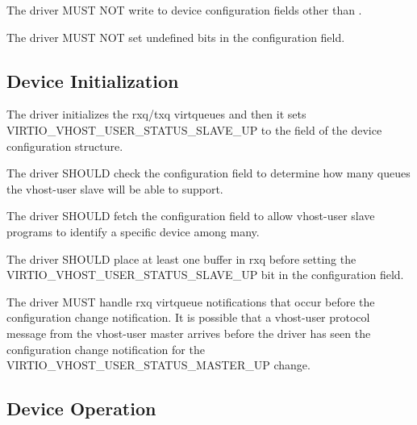 
The driver MUST NOT write to device configuration fields other than
.

The driver MUST NOT set undefined bits in the  configuration field.

\subsection{Device Initialization}\label{sec:Device Types / Vhost-user Device Backend / Device Initialization}

The driver initializes the rxq/txq virtqueues and then it sets
VIRTIO_VHOST_USER_STATUS_SLAVE_UP to the  field of the device
configuration structure.


The driver SHOULD check the  configuration field to
determine how many queues the vhost-user slave will be able to support.

The driver SHOULD fetch the  configuration field to allow
vhost-user slave programs to identify a specific device among many.

The driver SHOULD place at least one buffer in rxq before setting the
VIRTIO_VHOST_USER_STATUS_SLAVE_UP bit in the  configuration field.

The driver MUST handle rxq virtqueue notifications that occur before the
configuration change notification.  It is possible that a vhost-user protocol
message from the vhost-user master arrives before the driver has seen the
configuration change notification for the VIRTIO_VHOST_USER_STATUS_MASTER_UP
 change.

\subsection{Device Operation}\label{sec:Device Types / Vhost-user Device Backend / Device Operation}

